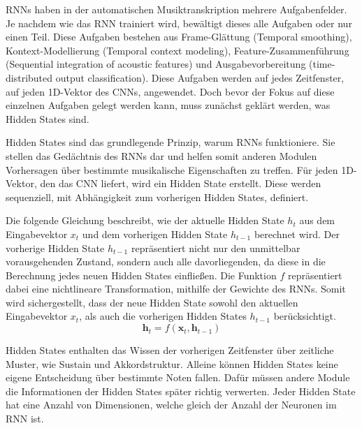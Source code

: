 RNNs haben in der automatischen Musiktranskription mehrere Aufgabenfelder.
Je nachdem wie das RNN trainiert wird, bewältigt dieses alle Aufgaben oder nur einen Teil.
Diese Aufgaben bestehen aus Frame-Glättung (Temporal smoothing), Kontext-Modellierung (Temporal context modeling),
Feature-Zusammenführung (Sequential integration of acoustic features)
und Ausgabevorbereitung (time-distributed output classification).
Diese Aufgaben werden auf jedes Zeitfenster, auf jeden 1D-Vektor des CNNs, angewendet.
Doch bevor der Fokus auf diese einzelnen Aufgaben gelegt werden kann, muss zunächst geklärt werden, was Hidden States sind.

\begin{description}[style=nextline]
\item[Hidden States]\label{itm:hidden}
Hidden States sind das grundlegende Prinzip, warum RNNs funktioniere.
Sie stellen das Gedächtnis des RNNs dar und helfen somit
anderen Modulen Vorhersagen über bestimmte musikalische Eigenschaften zu treffen.
Für jeden 1D-Vektor, den das CNN liefert, wird ein Hidden State erstellt.
Diese werden sequenziell, mit Abhängigkeit zum vorherigen Hidden States, definiert.

Die folgende Gleichung beschreibt, wie der aktuelle Hidden State $h_t$ aus dem Eingabevektor $x_t$ und dem vorherigen Hidden State $h_{t-1}$ berechnet wird.
Der vorherige Hidden State $h_{t-1}$ repräsentiert nicht nur den unmittelbar vorausgehenden Zustand,
sondern auch alle davorliegenden, da diese in die Berechnung jedes neuen Hidden States einfließen.
Die Funktion $f$ repräsentiert dabei eine nichtlineare Transformation, mithilfe der Gewichte des RNNs.
Somit wird sichergestellt, dass der neue Hidden State sowohl den aktuellen Eingabevektor $x_t$, als auch die vorherigen Hidden States $h_{t-1}$ berücksichtigt.
\[
\mathbf{h}_t = f(\mathbf{x}_t, \mathbf{h}_{t-1})
\]

Hidden States enthalten das Wissen der vorherigen Zeitfenster über zeitliche Muster, wie Sustain und Akkordstruktur.
Alleine können Hidden States keine eigene Entscheidung über bestimmte Noten fallen.
Dafür müssen andere Module die Informationen der Hidden States später richtig verwerten.
Jeder Hidden State hat eine Anzahl von Dimensionen, welche gleich der Anzahl der Neuronen im RNN ist.
\end{description}

